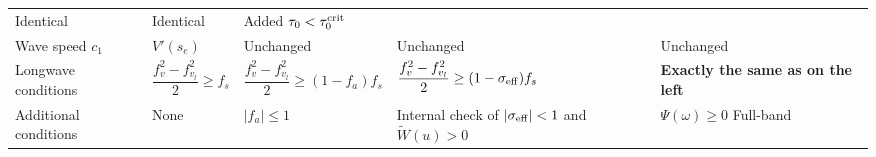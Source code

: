 \documentclass[11pt,a4paper,openany]{book}
\numberwithin{equation}{chapter}
\numberwithin{figure}{chapter}
\numberwithin{table}{chapter}
\begin{document}
\begin{center}
\begin{tabular}{p{1.8cm}p{2.9cm}p{3.4cm}p{3.2cm}p{2.5cm}}
 Identical




&




 Identical




&




 Added $\tau_0<\tau_0^{\rm crit}$



\\[3pt]

Wave speed $c_1$




& $V'(s_e)$ &




 Unchanged




&




 Unchanged




&




 Unchanged



\\[3pt]

Longwave conditions




& $\dfrac{f_v^2-f_{v_l}^2}{2}\ge f_s$
        & $\dfrac{f_v^2-f_{v_l}^2}{2}\ge(1-f_a)f_s$
        & $\dfrac{f_v^2-f_{v_l}^2}{2}\ge(1-\sigma_{\rm eff})f_s$
        & \textbf{Exactly the same as on the left} \\[10pt]

Additional conditions




&




 None




& $\left|f_a\right|\le1$
        &




 Internal check of $\left|\sigma_{\rm eff}\right|<1$ and $\widetilde W(u)>0$







&




 $\Psi(\omega)\ge0$ Full-band



\\[8pt]


\end{tabular}
\end{center}
\end{document}
